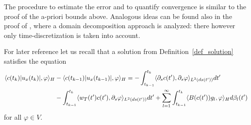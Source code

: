 \documentclass[a4paper,10pt]{article}
\numberwithin{equation}{section}
\begin{document}
The procedure to estimate the error and to quantify convergence is similar to the proof of the a-priori bounds above.
Analogous ideas can be found also in the proof of \cite[Theorem 4.4]{BDE}, where a domain decomposition approach is analyzed: there however only time-discretization is taken into account.

For later reference let us recall that a solution from Definition~\ref{def_solution} satisfies the equation
\begin{align}\label{eq4c}
\langle c(t_{k}) |u_{x}(t_{k})|, \varphi \rangle_{H} &- \langle c(t_{k-1}) |u_{x}(t_{k-1})|, \varphi \rangle_{H}
 = -\int_{t_{k-1}}^{t_{k}} \langle \partial_{s} c(t'), \partial_{s} \varphi \rangle_{L^{2} (ds(t'))} dt' \notag \\
&-\int_{t_{k-1}}^{t_{k}}
\langle w_{T}(t') c(t'), \partial_{s} \varphi \rangle_{L^{2} (ds(t'))} dt'
+ \sum_{l=1}^{\infty}\int_{t_{k-1}}^{t_{k}} \langle B (c(t')) g_{l} , \varphi \rangle_{H} d \beta_{l}(t')
\end{align}
for all $\varphi \in V$.
\end{document}
